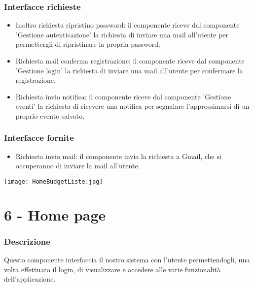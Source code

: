 \documentclass[a4paper,12pt]{article}
\begin{document}
\subsubsection*{Interfacce richieste}
\begin{itemize} \setlength\itemsep{0.01em}
\item {\sffamily Inoltro richiesta ripristino password}: il componente riceve dal componente 'Gestione autenticazione' la richiesta di inviare una mail all'utente per permettergli di ripristinare la propria password.
\item {\sffamily Richiesta mail conferma registrazione}: il componente riceve dal componente 'Gestione login' la richiesta di inviare una mail all'utente per confermare la registrazione.
\item {\sffamily Richiesta invio notifica}: il componente riceve dal componente 'Gestione eventi' la richiesta di ricevere una notifica per segnalare l'approssimarsi di un proprio evento salvato.

\end{itemize}

\subsubsection*{Interfacce fornite}
\begin{itemize} \setlength\itemsep{0.01em}
\item {\sffamily Richiesta invio mail}: il componente invia la richiesta a Gmail, che si occuperanno di inviare la mail all'utente.
\end{itemize}



\clearpage
\begin{center}
  \texttt{[image: HomeBudgetListe.jpg]}
\end{center}

\section*{6 -  Home page}
\subsubsection*{Descrizione}
Questo componente interfaccia il nostro sistema con l'utente permettendogli, una volta effettuato il login, di visualizzare e accedere alle varie funzionalità dell'applicazione. 
\end{document}
